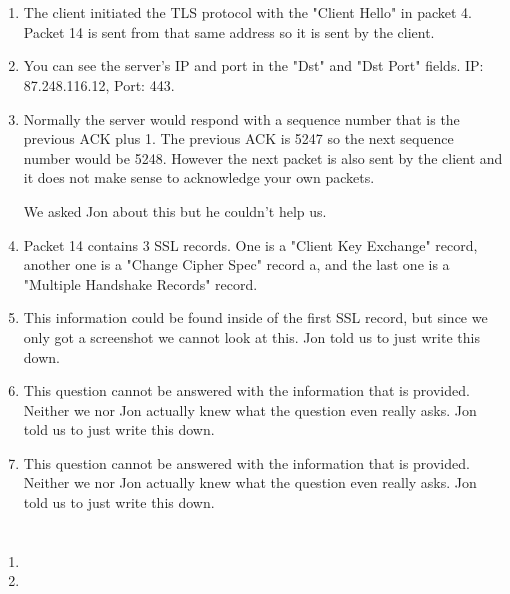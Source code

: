 \documentclass[12pt, a4paper]{article}
\begin{document}
\section{} %
\begin{enumerate}[a]
	\item %
	The client initiated the TLS protocol with the "Client Hello" in packet 4. Packet 14 is sent from that same address so it is sent by the client.
	\item %
	You can see the server's IP and port in the "Dst" and "Dst Port" fields. IP: 87.248.116.12, Port: 443.
	\item %
	Normally the server would respond with a sequence number that is the previous ACK plus 1. The previous ACK is 5247 so the next sequence number would be 5248. However the next packet is also sent by the client and it does not make sense to acknowledge your own packets.

	We asked Jon about this but he couldn't help us.
	\item %
	Packet 14 contains 3 SSL records. One is a "Client Key Exchange" record, another one is a "Change Cipher Spec" record a, and the last one is a "Multiple Handshake Records" record.
	\item %
	This information could be found inside of the first SSL record, but since we only got a screenshot we cannot look at this. Jon told us to just write this down.
	\item %
	This question cannot be answered with the information that is provided. Neither we nor Jon actually knew what the question even really asks. Jon told us to just write this down.
	\item %
	This question cannot be answered with the information that is provided. Neither we nor Jon actually knew what the question even really asks. Jon told us to just write this down.
\end{enumerate}

\section{} %
\begin{enumerate}[a]
	\item %
	\item %
\end{enumerate}
\end{document}
